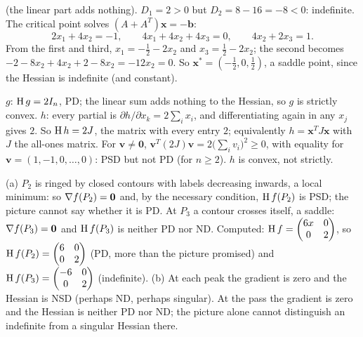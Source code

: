 \begin{solutions}
        (the linear part adds nothing). $D_{1}=2>0$ but
        $D_{2}=8-16=-8<0$: indefinite. The critical point solves
        $(A+A^{T})\mathbf{x}=-\mathbf{b}$:
        \[
          2x_{1}+4x_{2}=-1,\qquad 4x_{1}+4x_{2}+4x_{3}=0,\qquad
          4x_{2}+2x_{3}=1 .
        \]
        From the first and third, $x_{1}=-\tfrac12-2x_{2}$ and
        $x_{3}=\tfrac12-2x_{2}$; the second becomes
        $-2-8x_{2}+4x_{2}+2-8x_{2}=-12x_{2}=0$. So
        $\mathbf{x}^{*}=(-\tfrac12,0,\tfrac12)$, a saddle point, since the
        Hessian is indefinite (and constant).
  \item $g$: $\operatorname{H} g=2I_{n}$, PD; the linear sum adds nothing to the
        Hessian, so $g$ is strictly convex. $h$: every partial is
        $\partial h/\partial x_{k}=2\sum_{i}x_{i}$, and differentiating again
        in any $x_{j}$ gives $2$. So $\operatorname{H} h=2J$, the matrix with every
        entry $2$; equivalently $h=\mathbf{x}^{T}J\mathbf{x}$ with $J$ the
        all-ones matrix. For $\mathbf{v}\neq\mathbf{0}$,
        $\mathbf{v}^{T}(2J)\mathbf{v}=2\bigl(\sum_{i}v_{i}\bigr)^{2}\ge0$,
        with equality for $\mathbf{v}=(1,-1,0,\ldots,0)$: PSD but not PD
        (for $n\ge2$). $h$ is convex, not strictly.
  \item (a) $P_{2}$ is ringed by closed contours with labels decreasing
        inwards, a local minimum: so $\nabla f(P_{2})=\mathbf{0}$ and, by the
        necessary condition, $\operatorname{H} f(P_{2})$ is PSD; the picture cannot say
        whether it is PD. At $P_{3}$ a contour crosses itself, a saddle:
        $\nabla f(P_{3})=\mathbf{0}$ and $\operatorname{H} f(P_{3})$ is neither PD nor
        ND. Computed: $\operatorname{H} f=\begin{pmatrix}6x&0\\0&2\end{pmatrix}$, so
        $\operatorname{H} f(P_{2})=\begin{pmatrix}6&0\\0&2\end{pmatrix}$ (PD, more than
        the picture promised) and $\operatorname{H} f(P_{3})=\begin{pmatrix}-6&0\\0&2
        \end{pmatrix}$ (indefinite). (b) At each peak the gradient is zero
        and the Hessian is NSD (perhaps ND, perhaps singular). At the pass
        the gradient is zero and the Hessian is neither PD nor ND; the
        picture alone cannot distinguish an indefinite from a singular
        Hessian there.
\end{solutions}
